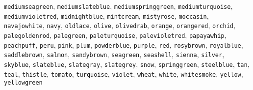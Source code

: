 \documentclass[pagesize=auto, fontsize=12pt, DIV=9, parskip=half]{scrartcl}
\begin{document}
\texttt{mediumseagreen},
\texttt{mediumslateblue},
\texttt{mediumspringgreen},
\texttt{mediumturquoise},
\texttt{mediumvioletred},
\texttt{midnightblue},
\texttt{mintcream},
\texttt{mistyrose},
\texttt{moccasin},
\texttt{navajowhite},
\texttt{navy},
\texttt{oldlace},
\texttt{olive},
\texttt{olivedrab},
\texttt{orange},
\texttt{orangered},
\texttt{orchid},
\texttt{palegoldenrod},
\texttt{palegreen},
\texttt{paleturquoise},
\texttt{palevioletred},
\texttt{papayawhip},
\texttt{peachpuff},
\texttt{peru},
\texttt{pink},
\texttt{plum},
\texttt{powderblue},
\texttt{purple},
\texttt{red},
\texttt{rosybrown},
\texttt{royalblue},
\texttt{saddlebrown},
\texttt{salmon},
\texttt{sandybrown},
\texttt{seagreen},
\texttt{seashell},
\texttt{sienna},
\texttt{silver},
\texttt{skyblue},
\texttt{slateblue},
\texttt{slategray},
\texttt{slategrey},
\texttt{snow},
\texttt{springgreen},
\texttt{steelblue},
\texttt{tan},
\texttt{teal},
\texttt{thistle},
\texttt{tomato},
\texttt{turquoise},
\texttt{violet},
\texttt{wheat},
\texttt{white},
\texttt{whitesmoke},
\texttt{yellow},
\texttt{yellowgreen}
\end{document}
